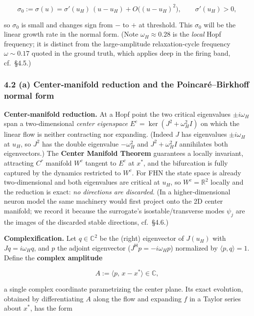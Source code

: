\documentclass[
  11pt,
]{article}
\providecommand{\gt}{>}
\begin{document}
\[
\sigma_0:=\sigma(u)=\sigma'(u_H)\,(u-u_H)+O\!\big((u-u_H)^2\big),\qquad \sigma'(u_H)\gt 0,
\tag{4.3}
\]

so \(\sigma_0\) is small and changes sign from \(-\) to \(+\) at
threshold. This \(\sigma_0\) will be the linear growth rate in the
normal form. (Note \(\omega_H\approx0.28\) is the \emph{local} Hopf
frequency; it is distinct from the large‑amplitude relaxation‑cycle
frequency \(\omega\sim0.17\) quoted in the ground truth, which applies
deep in the firing band, cf.~§4.5.)

\subsubsection{4.2 (a) Center‑manifold reduction and the
Poincaré--Birkhoff normal
form}\label{a-centermanifold-reduction-and-the-poincaruxe9birkhoff-normal-form}

\textbf{Center‑manifold reduction.} At a Hopf point the two critical
eigenvalues \(\pm i\omega_H\) span a two‑dimensional \emph{center
eigenspace} \(E^c=\ker(J^2+\omega_H^2 I)\) on which the linear flow is
neither contracting nor expanding. (Indeed \(J\) has eigenvalues
\(\pm i\omega_H\) at \(u_H\), so \(J^2\) has the double eigenvalue
\(-\omega_H^2\) and \(J^2+\omega_H^2I\) annihilates both eigenvectors.)
The \textbf{Center Manifold Theorem} guarantees a locally invariant,
attracting \(C^r\) manifold \(W^c\) tangent to \(E^c\) at \(x^*\), and
the bifurcation is fully captured by the dynamics restricted to \(W^c\).
For FHN the state space is already two‑dimensional and both eigenvalues
are critical at \(u_H\), so \(W^c=\mathbb{R}^2\) locally and the
reduction is exact: \emph{no directions are discarded}. (In a
higher‑dimensional neuron model the same machinery would first project
onto the 2D center manifold; we record it because the surrogate's
isostable/transverse modes \(\psi_j\) are the images of the discarded
stable directions, cf.~§4.6.)

\textbf{Complexification.} Let \(q\in\mathbb{C}^2\) be the (right)
eigenvector of \(J(u_H)\) with \(J q=i\omega_H q\), and \(p\) the
adjoint eigenvector (\(J^{\mathsf H}p=-i\omega_H p\)) normalized by
\(\langle p,q\rangle=1\). Define the \textbf{complex amplitude}

\[
A:=\langle p,\,x-x^*\rangle\in\mathbb{C},
\]

a single complex coordinate parametrizing the center plane. Its exact
evolution, obtained by differentiating \(A\) along the flow and
expanding \(f\) in a Taylor series about \(x^*\), has the form
\end{document}
